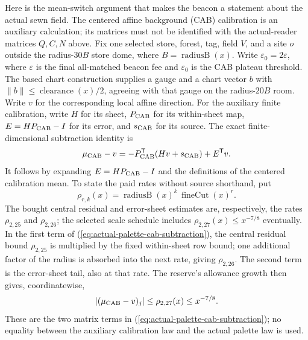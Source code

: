 Here is the mean-switch argument that makes the beacon a statement about
the actual sewn field. The centered affine background (CAB) calibration is
an auxiliary calculation;
its matrices must not be identified with the actual-reader matrices
$Q,C,N$ above. Fix one selected store, forest, tag, field $V$, and a site
$o$ outside the radius-$30B$ store dome, where $B=\operatorname{radiusB}(x)$.
Write $\varepsilon_0=2\varepsilon$, where $\varepsilon$ is the final
all-matched beacon fee and $\varepsilon_0$ is the CAB plateau threshold.
The based chart construction supplies a gauge and a chart vector $b$ with
$\|b\|\leq\operatorname{clearance}(x)/2$, agreeing with that gauge on the
radius-$20B$ room. Write $v$ for the corresponding local affine direction.
For the auxiliary finite calibration, write $H$ for its sheet,
$P_{\rm CAB}$ for its within-sheet map,
$E=HP_{\rm CAB}-I$ for its error, and $s_{\rm CAB}$ for its source.
The exact finite-dimensional subtraction identity is
\begin{equation}\label{eq:actual-palette-cab-subtraction}
 \mu_{\rm CAB}-v
   =-P_{\rm CAB}^{\mathsf T}(Hv+s_{\rm CAB})+E^{\mathsf T}v.
\end{equation}
It follows by expanding $E=HP_{\rm CAB}-I$ and the definitions of the centered
calibration mean. To state the paid rates without source shorthand, put
\[
 \rho_{r,k}(x)=\operatorname{radiusB}(x)^k
                    \,\operatorname{fineCut}(x)^r.
\]
The bought central residual and error-sheet estimates are, respectively,
the rates $\rho_{2,25}$ and $\rho_{2,26}$;
the selected scale schedule includes $\rho_{2,27}(x)\leq x^{-7/8}$
eventually. In the first term of (\ref{eq:actual-palette-cab-subtraction}),
the central residual bound $\rho_{2,25}$ is multiplied by the fixed
within-sheet row bound; one additional factor of the radius is absorbed
into the next rate, giving $\rho_{2,26}$. The second term is the
error-sheet tail, also at that rate. The reserve's allowance growth then
gives, coordinatewise,
\begin{equation}\label{eq:actual-palette-cab-velocity}
 |(\mu_{\rm CAB}-v)_j|\leq \rho_{2,27}(x)\leq x^{-7/8}.
\end{equation}
These are the two matrix terms in (\ref{eq:actual-palette-cab-subtraction});
no equality between the auxiliary calibration law and the actual palette
law is used.

